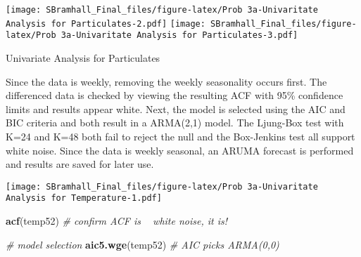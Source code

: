 \documentclass[]{article}
\newenvironment{Shaded}{\begin{snugshade}}{\end{snugshade}}
\newcommand{\KeywordTok}[1]{\textcolor[rgb]{0.13,0.29,0.53}{\textbf{#1}}}
\newcommand{\DataTypeTok}[1]{\textcolor[rgb]{0.13,0.29,0.53}{#1}}
\newcommand{\DecValTok}[1]{\textcolor[rgb]{0.00,0.00,0.81}{#1}}
\newcommand{\StringTok}[1]{\textcolor[rgb]{0.31,0.60,0.02}{#1}}
\newcommand{\CommentTok}[1]{\textcolor[rgb]{0.56,0.35,0.01}{\textit{#1}}}
\newcommand{\OperatorTok}[1]{\textcolor[rgb]{0.81,0.36,0.00}{\textbf{#1}}}
\newcommand{\NormalTok}[1]{#1}
\begin{document}
\begin{Shaded}
\end{Shaded}

\texttt{[image: SBramhall\_Final\_files/figure-latex/Prob 3a-Univaritate Analysis for Particulates-2.pdf]}
\texttt{[image: SBramhall\_Final\_files/figure-latex/Prob 3a-Univaritate Analysis for Particulates-3.pdf]}

 Univariate Analysis for Particulates

Since the data is weekly, removing the weekly seasonality occurs first.
The differenced data is checked by viewing the resulting ACF with 95\%
confidence limits and results appear white. Next, the model is selected
using the AIC and BIC criteria and both result in a ARMA(2,1) model. The
Ljung-Box test with K=24 and K=48 both fail to reject the null and the
Box-Jenkins test all support white noise. Since the data is weekly
seasonal, an ARUMA forecast is performed and results are saved for later
use.

\begin{Shaded}
\end{Shaded}

\texttt{[image: SBramhall\_Final\_files/figure-latex/Prob 3a-Univaritate Analysis for Temperature-1.pdf]}

\begin{Shaded}
\begin{Highlighting}[]
\KeywordTok{acf}\NormalTok{(temp52)                                         }\CommentTok{# confirm ACF is ~ white noise, it is!}

\CommentTok{# model selection}
\KeywordTok{aic5.wge}\NormalTok{(temp52)                                    }\CommentTok{# AIC picks ARMA(0,0)}
\end{Highlighting}
\end{Shaded}
\end{document}

